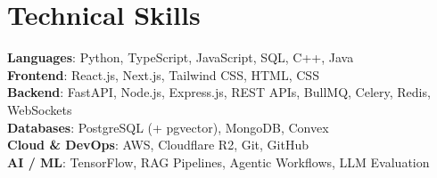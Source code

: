 \documentclass[a4paper,11pt]{article}
\begin{document}
\section{\textbf{Technical Skills}}
 \begin{itemize}[leftmargin=0.05in, label={}]
    \small{\item{
     \textbf{Languages}{: Python, TypeScript, JavaScript, SQL, C++, Java} \\
     \textbf{Frontend}{: React.js, Next.js, Tailwind CSS, HTML, CSS} \\
     \textbf{Backend}{: FastAPI, Node.js, Express.js, REST APIs, BullMQ, Celery, Redis, WebSockets} \\
     \textbf{Databases}{: PostgreSQL (+ pgvector), MongoDB, Convex} \\
     \textbf{Cloud \& DevOps}{: AWS, Cloudflare R2, Git, GitHub} \\
     \textbf{AI / ML}{: TensorFlow, RAG Pipelines, Agentic Workflows, LLM Evaluation} \\
    }}
 \end{itemize}
\vspace{-8pt}
\end{document}

